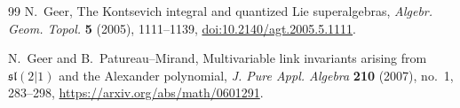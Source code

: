 \documentclass[11pt,a4paper]{article}
\theoremstyle{definition}
\theoremstyle{remark}
\begin{document}
\begin{thebibliography}{99}
N.~Geer,
\newblock The Kontsevich integral and quantized Lie superalgebras,
\newblock \emph{Algebr. Geom. Topol.} \textbf{5} (2005), 1111--1139,
\newblock \href{https://doi.org/10.2140/agt.2005.5.1111}
{doi:10.2140/agt.2005.5.1111}.

N.~Geer and B.~Patureau--Mirand,
\newblock Multivariable link invariants arising from
\(\mathfrak{sl}(2|1)\) and the Alexander polynomial,
\newblock \emph{J. Pure Appl. Algebra} \textbf{210} (2007), no.~1,
283--298,
\newblock \url{https://arxiv.org/abs/math/0601291}.

\end{thebibliography}
\end{document}
